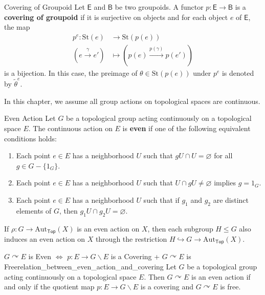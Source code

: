 \documentclass{report}
\def\acts{\curvearrowright}
\begin{document}
\begin{definition}{Covering of Groupoid}{}
	Let $\mathsf{E}$ and $\mathsf{B}$ be two groupoids. A functor $p:\mathsf{E}\to\mathsf{B}$ is a \textbf{covering of groupoid} if it is surjective on objects and for each object $e$ of $\mathsf{E}$, the map
	\begin{align*}
		p^{e}:\mathrm{St}(e)                  & \longrightarrow\mathrm{St}(p(e))                           \\
		\left(e\xrightarrow{\gamma} e'\right) & \longmapsto \left(p(e)\xrightarrow{p(\gamma)} p(e')\right)
	\end{align*}
	is a bijection. In this case, the preimage of $\theta\in\mathrm{St}(p(e))$ under $p^{e}$ is denoted by $\widetilde{\theta}^e$.
\end{definition}

In this chapter, we assume all group actions on topological spaces are continuous.


\begin{definition}{Even Action}{}
	Let $G$ be a topological group acting continuously on a topological space $E$. The continuous action on $E$ is \textbf{even} if one of the following equivalent conditions holds:
	\begin{enumerate}
		\item Each point $e \in E$ has a neighborhood $U$ such that $gU\cap U=\varnothing$ for all $g\in G-\{1_G\}$.
		\item Each point $e \in E$ has a neighborhood $U$ such that $U \cap gU \neq \varnothing$ implies $g=1_G$.
		\item Each point $e \in E$ has a neighborhood $U$ such that if $g_1$ and $g_2$ are distinct elements of $G$, then $g_1 U\cap g_2U =\varnothing$.
	\end{enumerate}
\end{definition}


If $\rho:G\to \mathrm{Aut}_{\mathsf{Top}}(X)$ is an even action on $X$, then each subgroup $H\leq G$ also induces an even action on $X$ through the restriction $H\hookrightarrow G\to \mathrm{Aut}_{\mathsf{Top}}(X)$.

\begin{proposition}{$G \acts E$ is Even $\iff$ $p: E\to G\backslash E$ is a Covering + $G \acts E$ is Free}{relation_between_even_action_and_covering}
	Let $G$ be a topological group acting continuously on a topological space $E$. Then $G \acts E$ is an even action if and only if the quotient map $p: E\to G\backslash E$ is a covering and $G \acts E$ is free.
\end{proposition}
\end{document}
